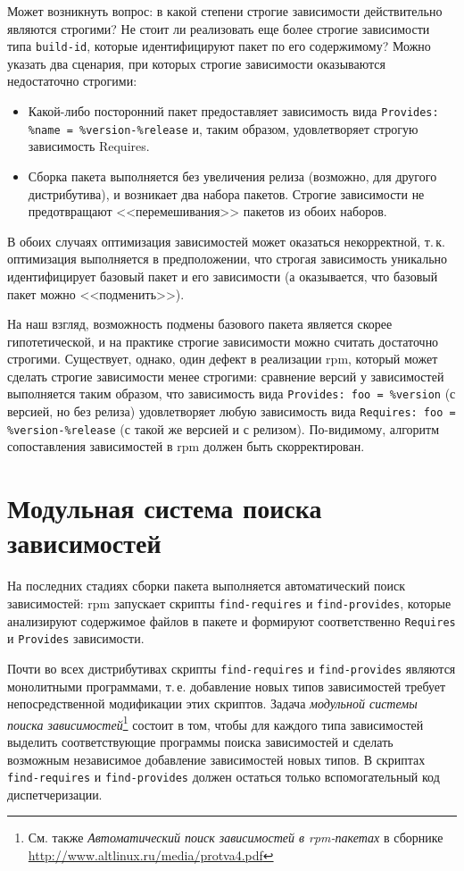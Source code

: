 \documentclass[russian,a4paper,12pt,titlepage]{article}
\begin{document}
Может возникнуть вопрос: в какой степени строгие зависимости действительно являются строгими?
Не стоит ли реализовать еще более строгие зависимости типа \verb|build-id|, которые идентифицируют пакет по его содержимому?
Можно указать два сценария, при которых строгие зависимости оказываются недостаточно строгими:
\begin{itemize}
\item Какой-либо посторонний пакет предоставляет зависимость вида \verb|Provides:| \verb|%name = %version-%release| и,
таким образом, удовлетворяет строгую зависимость Requires.
\item Сборка пакета выполняется без увеличения релиза (возможно, для другого дистрибутива), и возникает два набора пакетов.
Строгие зависимости не предотвращают <<перемешивания>> пакетов из обоих наборов.
\end{itemize}
В обоих случаях оптимизация зависимостей может оказаться некорректной, т.\,к. оптимизация выполняется в предположении,
что строгая зависимость уникально идентифицирует базовый пакет и его зависимости (а оказывается, что базовый пакет можно <<подменить>>).

На наш взгляд, возможность подмены базового пакета является скорее гипотетической, и на практике строгие зависимости
можно считать достаточно строгими.  Существует, однако, один дефект в реализации rpm, который может сделать строгие
зависимости менее строгими: сравнение версий у зависимостей выполняется таким образом, что зависимость вида
\verb|Provides: foo = %version| (с версией, но без релиза) удовлетворяет любую зависимость вида
\verb|Requires: foo = %version-%release| (с такой же версией и с релизом).
По-видимому, алгоритм сопоставления зависимостей в rpm должен быть скорректирован.

\section{Модульная система поиска зависимостей}
На последних стадиях сборки пакета выполняется автоматический поиск зависимостей:
rpm запускает скрипты \verb|find-requires| и \verb|find-provides|, которые анализируют
содержимое файлов в пакете и формируют соответственно \verb|Requires| и \verb|Provides| зависимости.

Почти во всех дистрибутивах скрипты \verb|find-requires| и \verb|find-provides| являются
монолитными программами, т.\,е. добавление новых типов зависимостей требует непосредственной модификации
этих скриптов.  Задача \textit{модульной системы поиска зависимостей}\footnote{См. также
\textsl{Автоматический поиск зависимостей в rpm-пакетах} в сборнике
\url{http://www.altlinux.ru/media/protva4.pdf}}
состоит в том, чтобы для каждого типа зависимостей выделить соответствующие программы поиска зависимостей
и сделать возможным независимое добавление зависимостей новых типов.  В скриптах \verb|find-requires| и \verb|find-provides|
должен остаться только вспомогательный код диспетчеризации.
\end{document}
